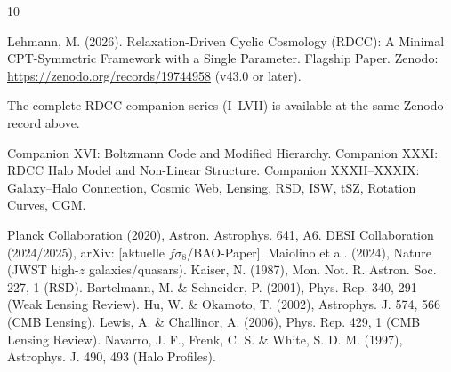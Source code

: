 \documentclass[11pt,a4paper]{article}
\begin{document}

\begin{thebibliography}{10}

 Lehmann, M. (2026). Relaxation-Driven Cyclic Cosmology (RDCC): A Minimal CPT-Symmetric Framework with a Single Parameter. Flagship Paper. Zenodo: \url{https://zenodo.org/records/19744958} (v43.0 or later).

 The complete RDCC companion series (I--LVII) is available at the same Zenodo record above.

 Companion XVI: Boltzmann Code and Modified Hierarchy.
 Companion XXXI: RDCC Halo Model and Non-Linear Structure.
 Companion XXXII--XXXIX: Galaxy--Halo Connection, Cosmic Web, Lensing, RSD, ISW, tSZ, Rotation Curves, CGM.

 Planck Collaboration (2020), Astron. Astrophys. 641, A6.
 DESI Collaboration (2024/2025), arXiv: [aktuelle $f\sigma_8$/BAO-Paper].
 Maiolino et al. (2024), Nature (JWST high-$z$ galaxies/quasars).
 Kaiser, N. (1987), Mon. Not. R. Astron. Soc. 227, 1 (RSD).
 Bartelmann, M. \& Schneider, P. (2001), Phys. Rep. 340, 291 (Weak Lensing Review).
 Hu, W. \& Okamoto, T. (2002), Astrophys. J. 574, 566 (CMB Lensing).
 Lewis, A. \& Challinor, A. (2006), Phys. Rep. 429, 1 (CMB Lensing Review).
 Navarro, J. F., Frenk, C. S. \& White, S. D. M. (1997), Astrophys. J. 490, 493 (Halo Profiles).

\end{thebibliography}
\end{document}
